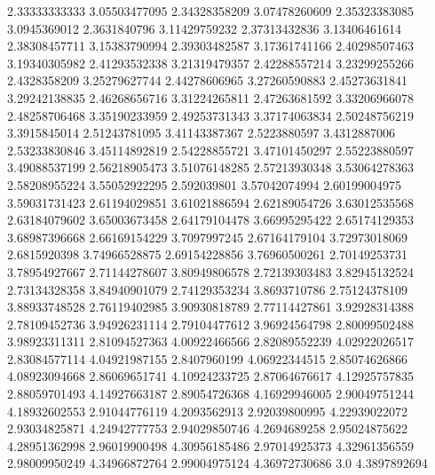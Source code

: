   2.33333333333    3.05503477095
  2.34328358209    3.07478260609
  2.35323383085     3.0945369012
   2.3631840796    3.11429759232
  2.37313432836    3.13406461614
  2.38308457711    3.15383790994
  2.39303482587    3.17361741166
  2.40298507463    3.19340305982
  2.41293532338    3.21319479357
  2.42288557214    3.23299255266
   2.4328358209    3.25279627744
  2.44278606965    3.27260590883
  2.45273631841    3.29242138835
  2.46268656716    3.31224265811
  2.47263681592    3.33206966078
  2.48258706468    3.35190233959
  2.49253731343    3.37174063834
  2.50248756219     3.3915845014
  2.51243781095    3.41143387367
   2.5223880597     3.4312887006
  2.53233830846    3.45114892819
  2.54228855721    3.47101450297
  2.55223880597    3.49088537199
  2.56218905473    3.51076148285
  2.57213930348    3.53064278363
  2.58208955224    3.55052922295
    2.592039801    3.57042074994
  2.60199004975    3.59031731423
  2.61194029851    3.61021886594
  2.62189054726    3.63012535568
  2.63184079602    3.65003673458
  2.64179104478    3.66995295422
  2.65174129353    3.68987396668
  2.66169154229     3.7097997245
  2.67164179104    3.72973018069
   2.6815920398    3.74966528875
  2.69154228856    3.76960500261
  2.70149253731    3.78954927667
  2.71144278607    3.80949806578
  2.72139303483    3.82945132524
  2.73134328358    3.84940901079
  2.74129353234     3.8693710786
  2.75124378109    3.88933748528
  2.76119402985    3.90930818789
  2.77114427861    3.92928314388
  2.78109452736    3.94926231114
  2.79104477612    3.96924564798
  2.80099502488    3.98923311311
  2.81094527363    4.00922466566
  2.82089552239    4.02922026517
  2.83084577114    4.04921987155
   2.8407960199    4.06922344515
  2.85074626866    4.08923094668
  2.86069651741    4.10924233725
  2.87064676617    4.12925757835
  2.88059701493    4.14927663187
  2.89054726368    4.16929946005
  2.90049751244    4.18932602553
  2.91044776119     4.2093562913
  2.92039800995    4.22939022072
  2.93034825871    4.24942777753
  2.94029850746     4.2694689258
  2.95024875622    4.28951362998
  2.96019900498    4.30956185486
  2.97014925373    4.32961356559
  2.98009950249    4.34966872764
  2.99004975124    4.36972730686
            3.0     4.3897892694
